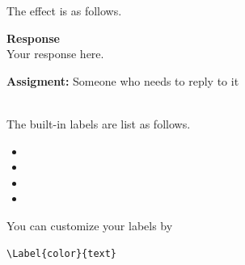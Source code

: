 The effect is as follows.

\begin{framed}
\noindent \textbf{Response}~\\

Your response here.

\begin{flushright}
  \textbf{Assigment:} Someone who needs to reply to it\\
  \Hard \\
\end{flushright}
\end{framed}

The built-in labels are list as follows.
\begin{itemize}
    \item \Hard
    \item \Medium
    \item \Easy
    \item \Done
\end{itemize}

You can customize your labels by
\begin{verbatim}
\Label{color}{text}
\end{verbatim}

